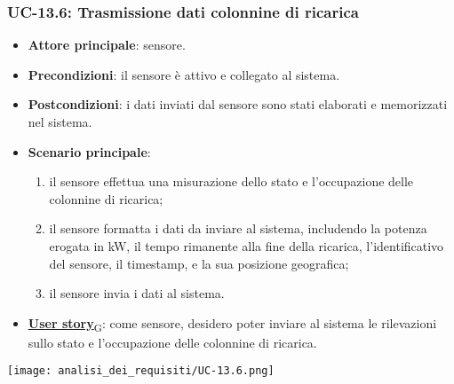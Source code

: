 \subsubsection{UC-13.6: Trasmissione dati colonnine di ricarica}
\begin{itemize}
	\item \textbf{Attore principale}: sensore.
	\item \textbf{Precondizioni}: il sensore è attivo e collegato al sistema.
	\item \textbf{Postcondizioni}: i dati inviati dal sensore sono stati elaborati e memorizzati nel sistema.
	\item \textbf{Scenario principale}:
	      \begin{enumerate}
		      \item il sensore effettua una misurazione dello stato e l'occupazione delle colonnine di ricarica;
		      \item il sensore formatta i dati da inviare al sistema, includendo la potenza erogata in kW, il tempo rimanente alla fine della ricarica, l'identificativo del sensore,
		            il timestamp, e la sua posizione geografica;
		      \item il sensore invia i dati al sistema.
	      \end{enumerate}
	\item \href{https://7last.github.io/docs/rtb/documentazione-interna/glossario\#user-story}{\textbf{User story}\textsubscript{G}}:
	      come sensore, desidero poter inviare al sistema le rilevazioni sullo stato e l'occupazione delle colonnine di ricarica.
\end{itemize}
\begin{center}
	\texttt{[image: analisi\_dei\_requisiti/UC-13.6.png]}
\end{center}

